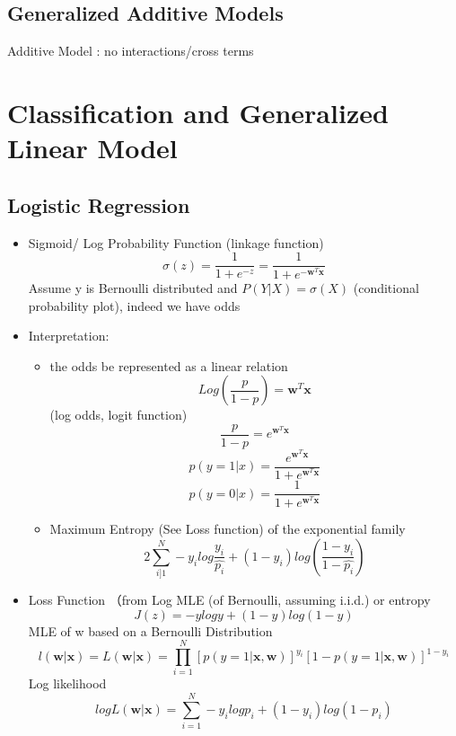 \documentclass[11pt, openany]{book}              %
\begin{document}
\section{Generalized Additive Models}

Additive Model : no interactions/cross terms

\chapter{Classification and Generalized Linear Model}

\section{Logistic Regression}

\begin{itemize}
	\item Sigmoid/ Log Probability Function (linkage function)
		$$ \sigma(z) = \frac{1}{1+e^{-z}} = \frac{1}{1+e^{-\mathbf{w}^T\mathbf{x}}}$$
	Assume y is Bernoulli distributed and  $P(Y|X) = \sigma(X)$ (conditional probability plot), indeed we have odds
	
	\item Interpretation: 
	\begin{itemize}
		\item the odds be represented as a linear relation 
		$$Log(\frac{p}{1-p}) = \mathbf{w}^T\mathbf{x}$$ (log odds, logit function)
		$$\frac{p}{1-p} = e^{\mathbf{w}^T\mathbf{x}}$$
     	$$ p(y=1|x) = \frac{e^{\mathbf{w}^T\mathbf{x}}}{1+e^{\mathbf{w}^T\mathbf{x}}}$$
     	$$p(y=0|x) = \frac{1}{1+e^{\mathbf{w}^T\mathbf{x}}}$$
     	\item Maximum Entropy (See Loss function) of the exponential family 
     	$$2 \sum_{i]1}^N -y_i log\frac{y_i}{\hat{p_i}}+ (1-y_i)log(\frac{1-y_i}{1-\hat{p_i}})$$
     \end{itemize}
     
	\item Loss Function （from Log MLE (of Bernoulli, assuming i.i.d.) or entropy
	$$J(z) = -ylogy + (1-y)log(1-y)$$
	MLE of w based on a Bernoulli Distribution
	$$l(\mathbf{w}|\mathbf{x}) = L(\mathbf{w}|\mathbf{x}) = \prod_{i=1}^N[p(y=1|\mathbf{x,w})]^{y_i}[1-p(y=1|\mathbf{x,w})]^{1-y_i}$$
		Log likelihood
	$$log L(\mathbf{w}|\mathbf{x}) = \sum_{i=1}^N -y_i log p_i + (1-y_i)log(1-p_i)$$


\end{itemize}
\end{document}

